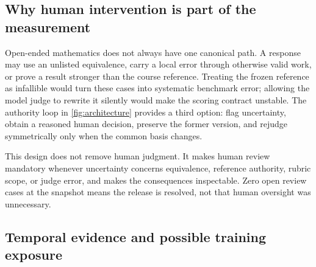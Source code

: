 \documentclass[11pt,a4paper,twocolumn]{article}
\begin{document}
\subsection{Why human intervention is part of the measurement}

Open-ended mathematics does not always have one canonical path. A response may
use an unlisted equivalence, carry a local error through otherwise valid work,
or prove a result stronger than the course reference. Treating the frozen
reference as infallible would turn these cases into systematic benchmark error;
allowing the model judge to rewrite it silently would make the scoring contract
unstable. The authority loop in \cref{fig:architecture} provides a third option:
flag uncertainty, obtain a reasoned human decision, preserve the former version,
and rejudge symmetrically only when the common basis changes.

This design does not remove human judgment. It makes human review mandatory
whenever uncertainty concerns equivalence, reference authority, rubric scope,
or judge error, and makes the consequences inspectable. Zero
open review cases at the snapshot means the release is resolved, not that human
oversight was unnecessary.

\subsection{Temporal evidence and possible training exposure}
\end{document}
